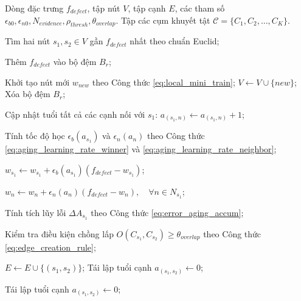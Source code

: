 \begin{algorithmic}[1]

\Require Dòng đặc trưng $f_{defect}$, tập nút $V$, tập cạnh $E$, các tham số $\epsilon_{b0}, \epsilon_{n0}, N_{evidence}, \rho_{thresh}, \theta_{overlap}$.
\Ensure Tập các cụm khuyết tật $\mathcal{C} = \{C_1, C_2, \dots, C_K\}$.


    \State Tìm hai nút $s_1, s_2 \in V$ gần $f_{defect}$ nhất theo chuẩn Euclid;


        \State Thêm $f_{defect}$ vào bộ đệm $B_r$;

            \State Khởi tạo nút mới $w_{new}$ theo Công thức \ref{eq:local_mini_train};
            \State $V \leftarrow V \cup \{new\}$; Xóa bộ đệm $B_r$;
        \EndIf

    \Else

        \State Cập nhật tuổi tất cả các cạnh nối với $s_1$:
        $a_{(s_1,n)} \leftarrow a_{(s_1,n)} + 1$;

        \State Tính tốc độ học $\epsilon_b(a_{s_1})$ và $\epsilon_n(a_n)$
        theo Công thức \ref{eq:aging_learning_rate_winner}
        và \ref{eq:aging_learning_rate_neighbor};

        \State $w_{s_1} \leftarrow
        w_{s_1} + \epsilon_b(a_{s_1})
        (f_{defect} - w_{s_1})$;

        \State $w_n \leftarrow
        w_n + \epsilon_n(a_n)
        (f_{defect} - w_n),
        \quad \forall n \in N_{s_1}$;

        \State Tính tích lũy lỗi $\Delta A_{s_1}$
        theo Công thức \ref{eq:error_aging_accum};


            \State Kiểm tra điều kiện chồng lấp
            $O(C_{s_1}, C_{s_2}) \ge \theta_{overlap}$
            theo Công thức \ref{eq:edge_creation_rule};

                \State $E \leftarrow E \cup \{(s_1, s_2)\}$;
                \State Tái lập tuổi cạnh
                $a_{(s_1,s_2)} \leftarrow 0$;
            \EndIf

        \Else

            \State Tái lập tuổi cạnh
            $a_{(s_1,s_2)} \leftarrow 0$;

        \EndIf


\end{algorithmic}
